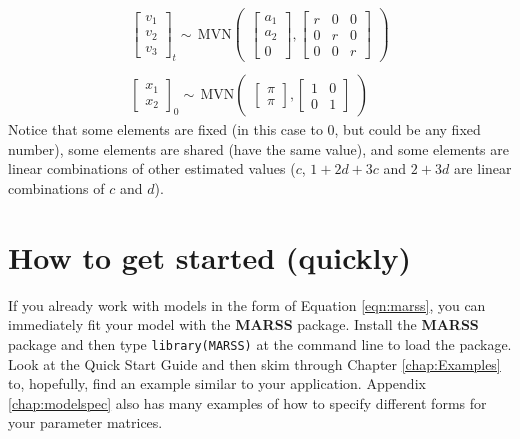 \documentclass[12pt,]{book}
\begin{document}
\begin{gather*}
\begin{bmatrix}v_1\\ v_2\\ v_3\end{bmatrix}_t \sim \,\text{MVN}\begin{pmatrix}\begin{bmatrix}a_1\\ a_2\\ 0\end{bmatrix},
 \begin{bmatrix}r&0&0\\0&r&0\\0&0&r\end{bmatrix} \end{pmatrix}  \\
\\
\begin{bmatrix}x_1\\ x_2\end{bmatrix}_0 \sim \,\text{MVN}\begin{pmatrix}\begin{bmatrix}\pi\\ \pi\end{bmatrix},\begin{bmatrix}1&0\\ 0&1\end{bmatrix} \end{pmatrix}
\end{gather*}
Notice that some elements are fixed (in this case to 0, but could be any fixed number), some elements are shared (have the same value), and some elements are linear combinations of other estimated values (\(c\), \(1+2d+3c\) and \(2+3d\) are linear combinations of \(c\) and \(d\)).

\hypertarget{how-to-get-started-quickly}{%
\chapter{How to get started (quickly)}\label{how-to-get-started-quickly}}

If you already work with models in the form of Equation \ref{eqn:marss}, you can immediately fit your model with the \textbf{MARSS} package. Install the \textbf{MARSS} package and then type \texttt{library(MARSS)} at the command line to load the package. Look at the Quick Start Guide and then skim through Chapter \ref{chap:Examples} to, hopefully, find an example similar to your application. Appendix \ref{chap:modelspec} also has many examples of how to specify different forms for your parameter matrices.
\end{document}

